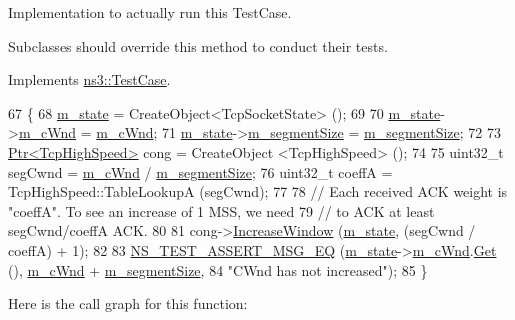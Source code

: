 Implementation to actually run this Test\+Case. 

Subclasses should override this method to conduct their tests. 

Implements \hyperlink{classns3_1_1TestCase_a8ff74680cf017ed42011e4be51917a24}{ns3\+::\+Test\+Case}.


\begin{DoxyCode}
67 \{
68   \hyperlink{classTcpHighSpeedIncrementTest_a05ee6e08927808018c90795bb93843f0}{m\_state} = CreateObject<TcpSocketState> ();
69 
70   \hyperlink{classTcpHighSpeedIncrementTest_a05ee6e08927808018c90795bb93843f0}{m\_state}->\hyperlink{classns3_1_1TcpSocketState_a7cd3d2156a483c1db436097477a0fd7f}{m\_cWnd} = \hyperlink{classTcpHighSpeedIncrementTest_a97d44cf5a9831a44e41e292241c71e1a}{m\_cWnd};
71   \hyperlink{classTcpHighSpeedIncrementTest_a05ee6e08927808018c90795bb93843f0}{m\_state}->\hyperlink{classns3_1_1TcpSocketState_a079872f7b0099ef5f3cab4ff47bd2edd}{m\_segmentSize} = \hyperlink{classTcpHighSpeedIncrementTest_a2df13eec369c2568c2ede7a3a28f6214}{m\_segmentSize};
72 
73   \hyperlink{classns3_1_1Ptr}{Ptr<TcpHighSpeed>} cong = CreateObject <TcpHighSpeed> ();
74 
75   uint32\_t segCwnd = \hyperlink{classTcpHighSpeedIncrementTest_a97d44cf5a9831a44e41e292241c71e1a}{m\_cWnd} / \hyperlink{classTcpHighSpeedIncrementTest_a2df13eec369c2568c2ede7a3a28f6214}{m\_segmentSize};
76   uint32\_t coeffA = TcpHighSpeed::TableLookupA (segCwnd);
77 
78   \textcolor{comment}{// Each received ACK weight is "coeffA". To see an increase of 1 MSS, we need}
79   \textcolor{comment}{// to ACK at least segCwnd/coeffA ACK.}
80 
81   cong->\hyperlink{classns3_1_1TcpNewReno_a11db8ae90f4cebacc15524a793b0741a}{IncreaseWindow} (\hyperlink{classTcpHighSpeedIncrementTest_a05ee6e08927808018c90795bb93843f0}{m\_state}, (segCwnd / coeffA) + 1);
82 
83   \hyperlink{group__testing_ga2a9d78cffb3db8e867c35fff0b698cf5}{NS\_TEST\_ASSERT\_MSG\_EQ} (\hyperlink{classTcpHighSpeedIncrementTest_a05ee6e08927808018c90795bb93843f0}{m\_state}->\hyperlink{classns3_1_1TcpSocketState_a7cd3d2156a483c1db436097477a0fd7f}{m\_cWnd}.\hyperlink{classns3_1_1TracedValue_a10fddd1de961ac65acfbeb440a1e8551}{Get} (), 
      \hyperlink{classTcpHighSpeedIncrementTest_a97d44cf5a9831a44e41e292241c71e1a}{m\_cWnd} + \hyperlink{classTcpHighSpeedIncrementTest_a2df13eec369c2568c2ede7a3a28f6214}{m\_segmentSize},
84                          \textcolor{stringliteral}{"CWnd has not increased"});
85 \}
\end{DoxyCode}


Here is the call graph for this function\+:




